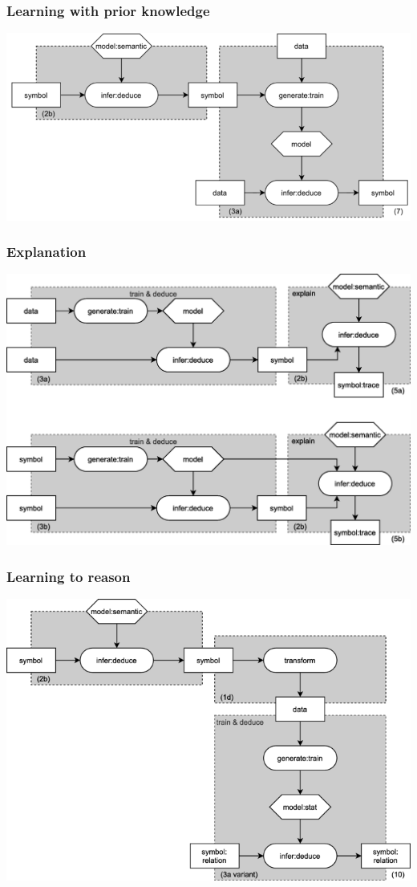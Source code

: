 \documentclass{beamer}
\begin{document}
\begin{frame}
  \frametitle{Learning with prior knowledge}
  \centering
  \includegraphics[width=.7\textwidth]{ns9.png}
\end{frame}

\begin{frame}
  \frametitle{Explanation}
  \centering
  \includegraphics[width=.7\textwidth]{im1.png}
\end{frame}

\begin{frame}
  \frametitle{Learning to reason}
  \centering
  \includegraphics[width=.7\textwidth]{im2.png}
\end{frame}
\end{document}
